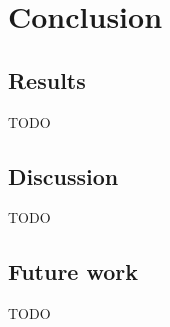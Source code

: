 \chapter{Conclusion}
\label{ch:conclusion}

\section{Results}

TODO

\section{Discussion}

TODO

\section{Future work}

TODO

